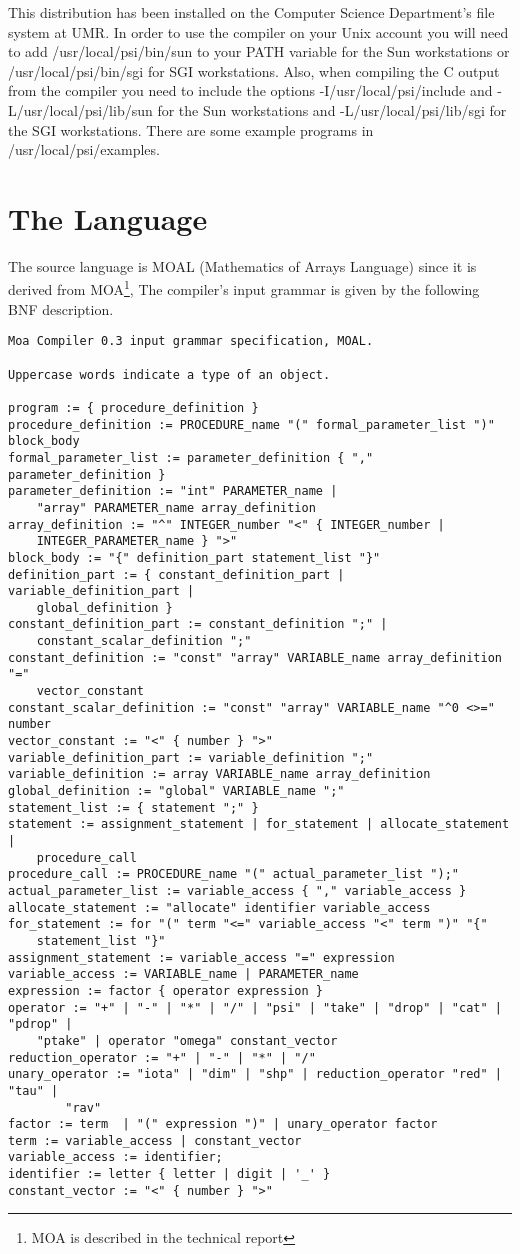 This distribution has been installed on the Computer Science Department's
file system at UMR.  In order to use the compiler on your Unix account
you will need to add /usr/local/psi/bin/sun to your PATH variable
for the Sun workstations or /usr/local/psi/bin/sgi for SGI workstations.
Also, when compiling the C output from the compiler you need to include the
options -I/usr/local/psi/include and -L/usr/local/psi/lib/sun for the
Sun workstations and -L/usr/local/psi/lib/sgi for the SGI workstations.
There are some example programs in /usr/local/psi/examples.

\section{The Language}
  The source language is MOAL (Mathematics of Arrays Language) since it
is derived from MOA\footnote{MOA is described in the technical report},
The compiler's input grammar is given by 
the following BNF description.
\begin{verbatim}
Moa Compiler 0.3 input grammar specification, MOAL.

Uppercase words indicate a type of an object.

program := { procedure_definition }
procedure_definition := PROCEDURE_name "(" formal_parameter_list ")" block_body
formal_parameter_list := parameter_definition { "," parameter_definition }
parameter_definition := "int" PARAMETER_name | 
	"array" PARAMETER_name array_definition
array_definition := "^" INTEGER_number "<" { INTEGER_number | 
	INTEGER_PARAMETER_name } ">"
block_body := "{" definition_part statement_list "}"
definition_part := { constant_definition_part | variable_definition_part |
	global_definition }
constant_definition_part := constant_definition ";" | 
	constant_scalar_definition ";"
constant_definition := "const" "array" VARIABLE_name array_definition "="
	vector_constant
constant_scalar_definition := "const" "array" VARIABLE_name "^0 <>=" number
vector_constant := "<" { number } ">"
variable_definition_part := variable_definition ";"
variable_definition := array VARIABLE_name array_definition
global_definition := "global" VARIABLE_name ";"
statement_list := { statement ";" }
statement := assignment_statement | for_statement | allocate_statement |
	procedure_call
procedure_call := PROCEDURE_name "(" actual_parameter_list ");"
actual_parameter_list := variable_access { "," variable_access }
allocate_statement := "allocate" identifier variable_access
for_statement := for "(" term "<=" variable_access "<" term ")" "{" 
	statement_list "}"
assignment_statement := variable_access "=" expression
variable_access := VARIABLE_name | PARAMETER_name
expression := factor { operator expression }
operator := "+" | "-" | "*" | "/" | "psi" | "take" | "drop" | "cat" | "pdrop" |
	"ptake" | operator "omega" constant_vector
reduction_operator := "+" | "-" | "*" | "/"
unary_operator := "iota" | "dim" | "shp" | reduction_operator "red" | "tau" | 
        "rav"
factor := term  | "(" expression ")" | unary_operator factor
term := variable_access | constant_vector
variable_access := identifier;
identifier := letter { letter | digit | '_' }
constant_vector := "<" { number } ">"

\end{verbatim}

